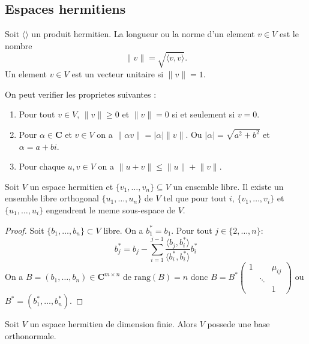 \subsection{Espaces hermitiens}

\begin{definition}
Soit $\langle  \rangle$ un produit hermitien. La longueur ou la norme d'un element $v\in V$ est le nombre
$$
\lVert v \rVert =\sqrt{ \langle v,v \rangle  }.
$$
Un element $v\in V$ est un vecteur unitaire si $\lVert v \rVert=1$.
\end{definition}
On peut verifier les proprietes suivantes :
\begin{enumerate}
\item Pour tout $v\in V$, $\lVert v \rVert \ge 0$ et $\lVert v \rVert=0$ si et seulement si $v=0$.
\item Pour $\alpha \in \mathbf{C}$ et $v\in V$ on a $\lVert \alpha v \rVert=|\alpha|\lVert v \rVert$. Ou $|\alpha|=\sqrt{a^{2}+b^{2}}$ et $\alpha=a+bi$.
\item Pour chaque $u,v\in V$ on a $\lVert u+v \rVert\le \lVert u \rVert + \lVert v \rVert$.
\end{enumerate}

\begin{theorem}
Soit $V$ un espace hermitien et $\{ v_{1},\dots,v_{n} \}\subseteq V$ un ensemble libre. Il existe un ensemble libre orthogonal $\{ u_{1},\dots,u_{n} \}$ de $V$ tel que pour tout $i$, $\{ v_{1},\dots,v_{i} \}$ et $\{ u_{1},\dots,u_{i} \}$ engendrent le meme sous-espace de $V$.
\end{theorem}
\begin{proof}
Soit $\{ b_{1},\dots,b_{n} \}\subset V$ libre. On a $b_{1}^{*}=b_{1}$. Pour tout $j\in \{ 2,\dots,n \}$:
$$
b_{j}^{*}=b_{j}-\sum_{i=1}^{j-1}  \frac{\langle b_{j},b_{i}^{*} \rangle }{\langle b_{i}^{*},b_{i}^{*} \rangle }b_{i}^{*}
$$
On a $B=(b_{1},\dots,b_{n})\in \mathbf{C}^{m\times n}$ de $\mathrm{rang}(B)=n$ donc $B=B^{*}\begin{pmatrix}1 &  & \mu _{ij} \\  & \ddots &  \\  &  & 1\end{pmatrix}$ ou $B^{*}=(b_{1}^{*},\dots,b_{n}^{*})$.
\end{proof}
\begin{corollary}
Soit $V$ un espace hermitien de dimension finie. Alors $V$ possede une base orthonormale.
\end{corollary}

